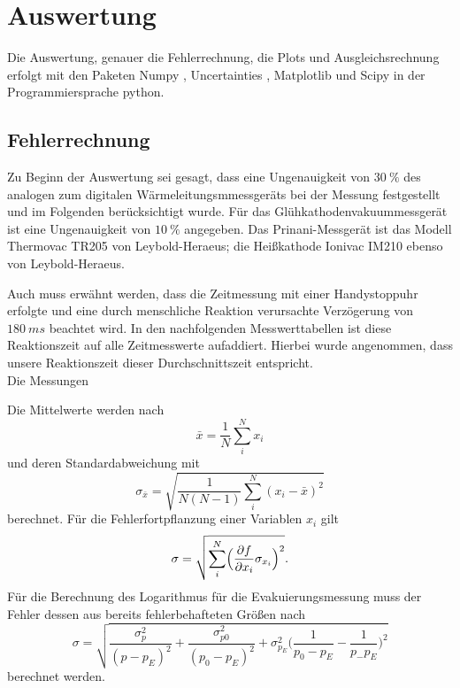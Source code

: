 \section{Auswertung}
Die Auswertung, genauer die Fehlerrechnung, die Plots und Ausgleichsrechnung erfolgt mit den Paketen
Numpy \cite{numpy}, Uncertainties \cite{uncertainties}, Matplotlib \cite{matplotlib} und Scipy \cite{scipy} in der Programmiersprache python.
\subsection{Fehlerrechnung}
Zu Beginn der Auswertung sei gesagt, dass eine Ungenauigkeit von $\SI{30}{\percent}$ des analogen zum digitalen Wärmeleitungsmmessgeräts
bei der Messung festgestellt und im Folgenden berücksichtigt wurde.
Für das Glühkathodenvakuummessgerät ist eine Ungenauigkeit von $\SI{10}{\percent}$ angegeben\cite{anleitung}.
Das Prinani-Messgerät ist das Modell Thermovac TR205 von Leybold-Heraeus; die Heißkathode Ionivac IM210 ebenso von Leybold-Heraeus.

Auch muss erwähnt werden, dass die Zeitmessung mit einer Handystoppuhr erfolgte und eine durch menschliche Reaktion verursachte
Verzögerung von $\SI{180}{ms}$ beachtet wird\cite{reaktion}.
In den nachfolgenden Messwerttabellen ist diese Reaktionszeit auf alle Zeitmesswerte aufaddiert.
Hierbei wurde angenommen, dass unsere Reaktionszeit dieser Durchschnittszeit entspricht.\\

Die Messungen


Die Mittelwerte werden nach
\begin{equation}
	\bar{x}=\frac{1}{N}\sum_{i}^N x_i
\end{equation}
und deren Standardabweichung mit
\begin{equation}
	\sigma_{\bar{x}} = \sqrt{\frac{1}{N(N-1)} \sum_{i}^N (x_i-\bar{x})^2}
\end{equation}
berechnet.
Für die Fehlerfortpflanzung einer Variablen $x_i$ gilt
\begin{equation}
	\sigma = \sqrt{\sum_{i}^N \Bigl(\frac{\partial f}{\partial x_i} \sigma_{x_i}\Bigr)^2}.
	\label{eq:gaussfehler}
\end{equation}
Für die Berechnung des Logarithmus für die Evakuierungsmessung muss der Fehler dessen aus bereits fehlerbehafteten Größen nach
\begin{equation}
	\sigma = \sqrt{\frac{\sigma_p^2}{(p-p_E)^2}+\frac{\sigma_{p0}^2}{(p_0-p_E)^2}+\sigma_{p_E}^2\bigl(\frac{1}{p_0-p_E}-\frac{1}{p_-p_E}\bigr)^2}
\end{equation}
berechnet werden.\clearpage
